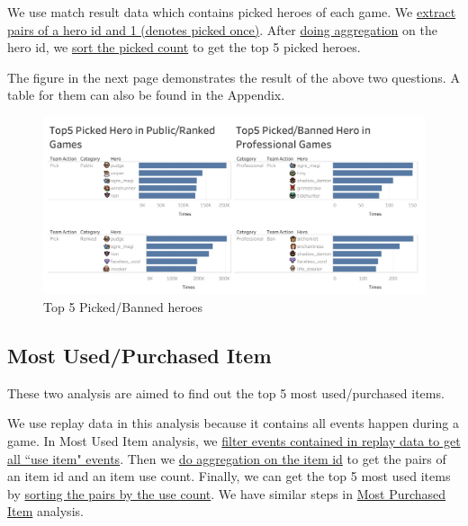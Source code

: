 \documentclass{article}
\begin{document}
We use match result data which contains picked heroes of each game. We \href{https://github.com/Vopaaz/big-data-psg-lgd/blob/master/src/main/scala/MostPick.scala#L34}{extract pairs of a hero id and 1 (denotes picked once)}. After \href{https://github.com/Vopaaz/big-data-psg-lgd/blob/master/src/main/scala/MostPick.scala#L35}{doing aggregation} on the hero id, we \href{https://github.com/Vopaaz/big-data-psg-lgd/blob/master/src/main/scala/MostPick.scala#L37}{sort the picked count} to get the top 5 picked heroes.

The figure in the next page demonstrates the result of the above two questions. A table for them can also be found in the Appendix.

\begin{figure}[H]
\centering
\includegraphics[width=\textwidth]{pic/MostPickedBanned.png}
\caption{Top 5 Picked/Banned heroes}
\label{Top 5 Picked/Banned heroes}
\end{figure}

\subsection{Most Used/Purchased Item}

These two analysis are aimed to find out the top 5 most used/purchased items.

We use replay data in this analysis because it contains all events happen during a game. In Most Used Item analysis, we \href{https://github.com/Vopaaz/big-data-psg-lgd/blob/master/src/main/scala/MostUsedItem.scala#L38-L40}{filter events contained in replay data to get all ``use item" events}.
Then we \href{https://github.com/Vopaaz/big-data-psg-lgd/blob/master/src/main/scala/MostUsedItem.scala#L41-L42}{do aggregation on the item id} to get the pairs of an item id and an item use count.
Finally, we can get the top 5 most used items by \href{https://github.com/Vopaaz/big-data-psg-lgd/blob/master/src/main/scala/MostUsedItem.scala#L44}{sorting the pairs by the use count}. We have similar steps in \href{https://github.com/Vopaaz/big-data-psg-lgd/blob/master/src/main/scala/MostPurchasedItem.scala}{Most Purchased Item} analysis.
\end{document}
